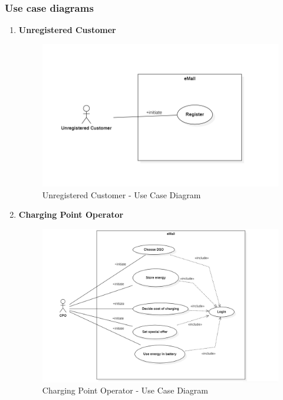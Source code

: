 \subsubsection{Use case diagrams}
\begin{enumerate}
    \item \textbf{Unregistered Customer}
    \begin{figure}[H]
        \begin{center}
            \includegraphics[width=\textwidth]{img/Unregistered_customer.PNG}
            \caption{Unregistered Customer - Use Case Diagram}
        \end{center}
    \end{figure}


    \item \textbf{Charging Point Operator}
    \begin{figure}[H]
        \begin{center}
            \includegraphics[width=\textwidth]{img/CPO_UseCase.PNG}
            \caption{Charging Point Operator - Use Case Diagram}
        \end{center}
    \end{figure}

\end{enumerate}
